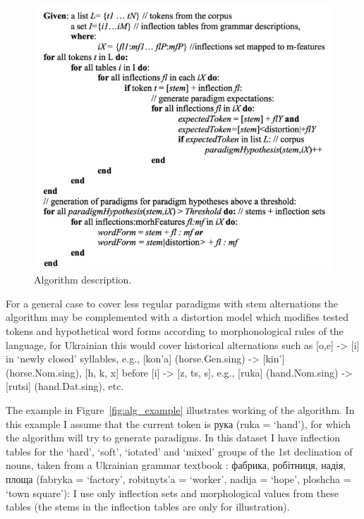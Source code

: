 \documentclass[11pt,a4paper]{article}
\begin{document}
\begin{figure}
	\includegraphics[width=\linewidth]{algorithm-description.jpg}
	\caption{Algorithm description.}
	\label{fig:alg1}
\end{figure}

For a general case to cover less regular paradigms with stem alternations the algorithm may be complemented with a distortion model which modifies tested tokens and hypothetical word forms according to morphonological rules of the language, for Ukrainian this would cover historical alternations such as [o,e] -> [i] in `newly closed' syllables, e.g., [kon'a] (horse.Gen.sing) -> [kin'] (horse.Nom.sing), [h, k, x] before [i] -> [z, ts, s], e.g., [ruka] (hand.Nom.sing) -> [rutsi] (hand.Dat.sing), etc.  

The example in Figure~\ref{fig:alg_example} illustrates working of the algorithm. In this example I assume that the current token is рука (ruka = `hand'), for which the algorithm will try to generate paradigms. In this dataset I have inflection tables for the `hard', `soft', `iotated' and `mixed' groups of the 1st declination of nouns, taken from a Ukrainian grammar textbook \cite{hryshchenko1997sulm}: фабрика, робітниця, надія, площа (fabryka = `factory', robitnyts'a = `worker', nadija = `hope', ploshcha = `town square'): I use only inflection sets and morphological values from these tables (the stems in the inflection tables are only for illustration).
\end{document}
